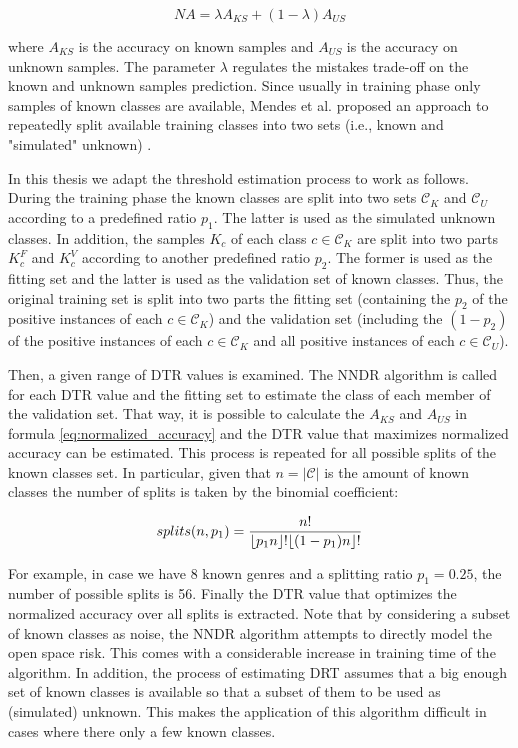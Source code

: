 \begin{equation}
\label{eq:normalized_accuracy}
NA = \lambda A_{KS} + (1 - \lambda) A_{US}
\end{equation}

\nointend where $A_{KS}$ is the accuracy on known samples and $A_{US}$ is the accuracy on unknown samples. The parameter $\lambda$ regulates the mistakes trade-off on the known and unknown samples prediction. Since usually in training phase only samples of known classes are available, Mendes et al. proposed an approach to repeatedly split available training classes into two sets (i.e., known and "simulated" unknown) . 

In this thesis we adapt the threshold estimation process to work as follows. During the training phase the known classes are split into two sets $\mathcal{C}_K$ and $\mathcal{C}_{U}$ according to a predefined ratio $p_1$. The latter is used as the simulated unknown classes. In addition, the samples $K_c$ of each class $c \in \mathcal{C}_K$ are split into two parts $K_c^F$ and $K_c^V$ according to another predefined ratio $p_2$. The former is used as the fitting set and the latter is used as the validation set of known classes. Thus, the original training set is split into two parts the fitting set (containing the $p_2$ of the positive instances of each $c \in \mathcal{C}_K$) and the validation set (including the $(1-p_2)$ of the positive instances of each $c \in \mathcal{C}_K$ and all positive instances of each $c \in \mathcal{C}_U$). 

Then, a given range of DTR values is examined. The NNDR algorithm is called for each DTR value and the fitting set to estimate the class of each member of the validation set. That way, it is possible to calculate the $A_{KS}$ and $A_{US}$ in formula \ref{eq:normalized_accuracy} and the DTR value that maximizes normalized accuracy can be estimated. This process is repeated for all possible splits of the known classes set. In particular, given that $n = |\mathcal{C}|$ is the amount of known classes the number of splits is taken by the binomial coefficient:

\begin{equation} \label{eq:splt}
    splits(n,p_1) = \frac{n!}{\floor*{p_1n}!\floor*{(1-p_1)n}!}
\end{equation}

For example, in case we have 8 known genres and a splitting ratio $p_1=0.25$, the number of possible splits is 56. Finally the DTR value that optimizes the normalized accuracy over all splits is extracted. Note that by considering a subset of known classes as noise, the NNDR algorithm attempts to directly model the open space risk. This comes with a considerable increase in training time of the algorithm. In addition, the process of estimating DRT assumes that a big enough set of known classes is available so that a subset of them to be used as (simulated) unknown. This makes the application of this algorithm difficult in cases where there only a few known classes.

